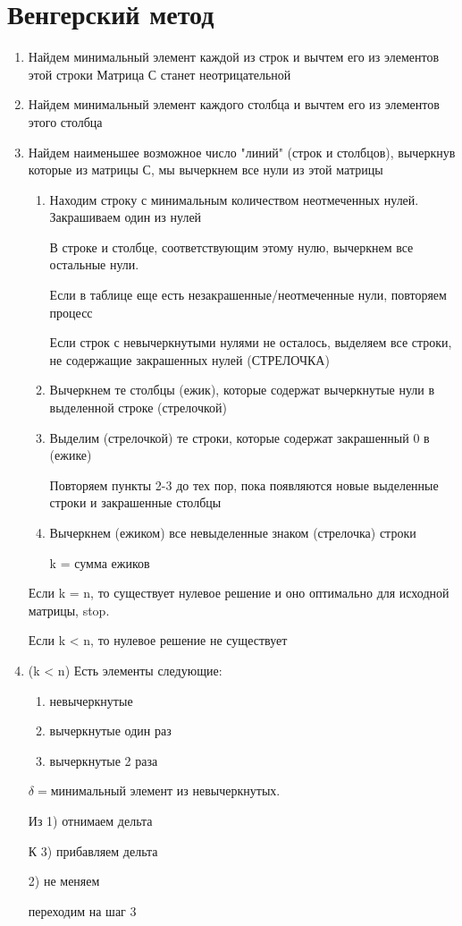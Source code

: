 \documentclass[a4paper, 12pt]{article}
\theoremstyle{definition}
\theoremstyle{remark}
\begin{document}
\section*{Венгерский метод}
    \begin{enumerate}
        \item Найдем минимальный элемент каждой из строк и вычтем его из элементов этой строки
        Матрица С станет неотрицательной
        \item Найдем минимальный элемент каждого столбца и вычтем его из элементов этого столбца
        \item Найдем наименьшее возможное число "линий" (строк и столбцов), вычеркнув которые из матрицы
        С, мы вычеркнем все нули из этой матрицы
        \begin{enumerate}
            \item Находим строку с минимальным количеством неотмеченных нулей. 
            Закрашиваем один из нулей

            В строке и столбце, соответствующим этому нулю, вычеркнем все остальные нули.

            Если в таблице еще есть незакрашенные/неотмеченные нули, повторяем процесс

            Если строк с невычеркнутыми нулями не осталось, выделяем все строки, не содержащие
            закрашенных нулей (СТРЕЛОЧКА)
            \item Вычеркнем те столбцы (ежик), которые содержат вычеркнутые нули в выделенной строке (стрелочкой)
            \item Выделим (стрелочкой) те строки, которые содержат закрашенный 0 в (ежике)

            Повторяем пункты 2-3 до тех пор, пока появляются новые выделенные строки и закрашенные столбцы
            \item Вычеркнем (ежиком) все невыделенные знаком (стрелочка) строки

            k = сумма ежиков
        \end{enumerate}
        
        Если k = n, то существует нулевое решение и оно оптимально для исходной матрицы, stop.

        Если k < n, то нулевое решение не существует
        \item (k < n)
        Есть элементы следующие:
        \begin{enumerate}
            \item невычеркнутые
            \item вычеркнутые один раз
            \item вычеркнутые 2 раза
        \end{enumerate}
        $\delta = $минимальный элемент из невычеркнутых.

        Из 1) отнимаем дельта

        К 3) прибавляем дельта

        2) не меняем
        
        переходим на шаг 3
    \end{enumerate}
\end{document}
